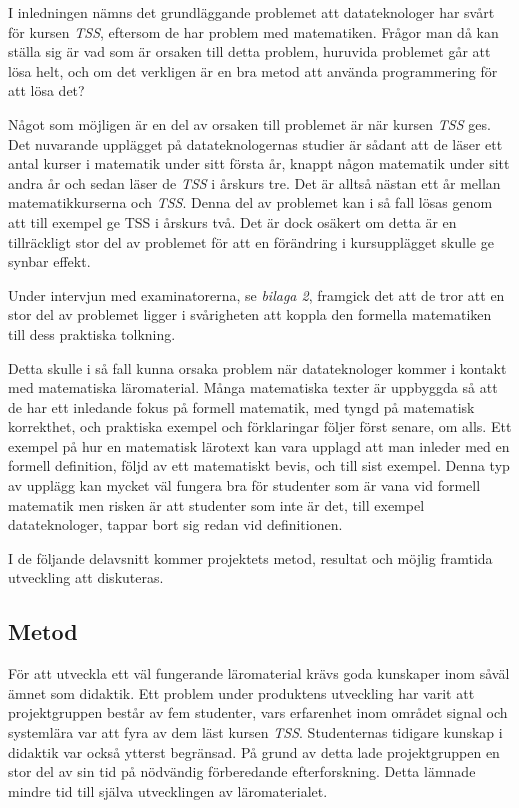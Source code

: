 \documentclass[]{article}
\begin{document}
I inledningen nämns det grundläggande problemet att datateknologer har svårt för kursen \textit{TSS}, eftersom de har problem
med matematiken. Frågor man då kan ställa sig är vad som är orsaken till detta problem, huruvida problemet går att lösa
helt, och om det verkligen är en bra metod att använda programmering för att lösa det?

Något som möjligen är en del av orsaken till problemet är när kursen \textit{TSS} ges. Det nuvarande upplägget på
datateknologernas studier är sådant att de läser ett antal kurser i matematik under sitt första år, knappt någon matematik
under sitt andra år och sedan läser de \textit{TSS} i årskurs tre. Det är alltså nästan ett år mellan matematikkurserna och
\textit{TSS}. Denna del av problemet kan i så fall lösas genom att till exempel ge TSS i årskurs två. Det är dock
osäkert om detta är en tillräckligt stor del av problemet för att en förändring i kursupplägget skulle ge synbar effekt.

Under intervjun med examinatorerna, se \textit{bilaga 2}, framgick det att de tror att en stor del av problemet ligger i
svårigheten att koppla den formella matematiken till dess praktiska tolkning.

Detta skulle i så fall kunna orsaka problem när datateknologer kommer i kontakt med matematiska läromaterial. Många
matematiska texter är uppbyggda så att de har ett inledande fokus på formell matematik, med tyngd på matematisk
korrekthet, och praktiska exempel och förklaringar följer först senare, om alls. Ett exempel på hur en matematisk
lärotext kan vara upplagd att man inleder med en formell definition, följd av ett matematiskt bevis, och till sist
exempel. Denna typ av upplägg kan mycket väl fungera bra för studenter som är vana vid formell matematik men risken är
att studenter som inte är det, till exempel datateknologer, tappar bort sig redan vid definitionen.

I de följande delavsnitt kommer projektets metod, resultat och möjlig framtida utveckling att diskuteras.

\subsection{Metod}
För att utveckla ett väl fungerande läromaterial krävs goda kunskaper inom såväl ämnet som didaktik. Ett problem under
produktens utveckling har varit att projektgruppen består av fem studenter, vars erfarenhet inom området signal och
systemlära var att fyra av dem läst kursen \textit{TSS}. Studenternas tidigare kunskap i didaktik var också ytterst
begränsad. På grund av detta lade projekt\-gruppen en stor del av sin tid på nödvändig förberedande efterforskning. Detta
lämnade mindre tid till själva utvecklingen av läromaterialet.
\end{document}
